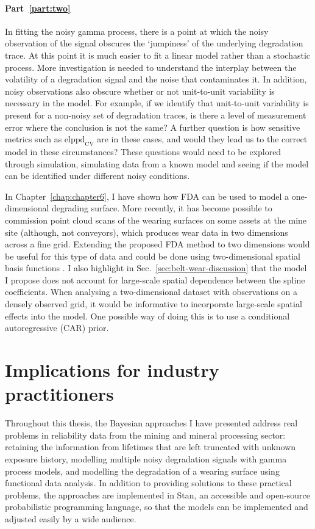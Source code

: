 \paragraph*{Part~\ref{part:two}} In fitting the noisy gamma process, there is a point at which the noisy observation of the signal obscures the `jumpiness' of the underlying degradation trace. At this point it is much easier to fit a linear model rather than a stochastic process. More investigation is needed to understand the interplay between the volatility of a degradation signal and the noise that contaminates it. In addition, noisy observations also obscure whether or not unit-to-unit variability is necessary in the model. For example, if we identify that unit-to-unit variability is present for a non-noisy set of degradation traces, is there a level of measurement error where the conclusion is not the same? A further question is how sensitive metrics such as $\mbox{elppd}_{\text{CV}}$ are in these cases, and would they lead us to the correct model in these circumstances? These questions would need to be explored through simulation, simulating data from a known model and seeing if the model can be identified under different noisy conditions.

In Chapter~\ref{chap:chapter6}, I have shown how FDA can be used to model a one-dimensional degrading surface. More recently, it has become possible to commission point cloud scans of the wearing surfaces on some assets at the mine site (although, not conveyors), which produces wear data in two dimensions across a fine grid. Extending the proposed FDA method to two dimensions would be useful for this type of data and could be done using two-dimensional spatial basis functions \citep[p. 84]{wikle_2019}. I also highlight in Sec.~\ref{sec:belt-wear-discussion} that the model I propose does not account for large-scale spatial dependence between the spline coefficients. When analysing a two-dimensional dataset with observations on a densely observed grid, it would be informative to incorporate large-scale spatial effects into the model. One possible way of doing this is to use a conditional autoregressive (CAR) prior.

\section{Implications for industry practitioners} \label{sec:thesis-practical}

Throughout this thesis, the Bayesian approaches I have presented address real problems in reliability data from the mining and mineral processing sector: retaining the information from lifetimes that are left truncated with unknown exposure history, modelling multiple noisy degradation signals with gamma process models, and modelling the degradation of a wearing surface using functional data analysis. In addition to providing solutions to these practical problems, the approaches are implemented in Stan, an accessible and open-source probabilistic programming language, so that the models can be implemented and adjusted easily by a wide audience.


